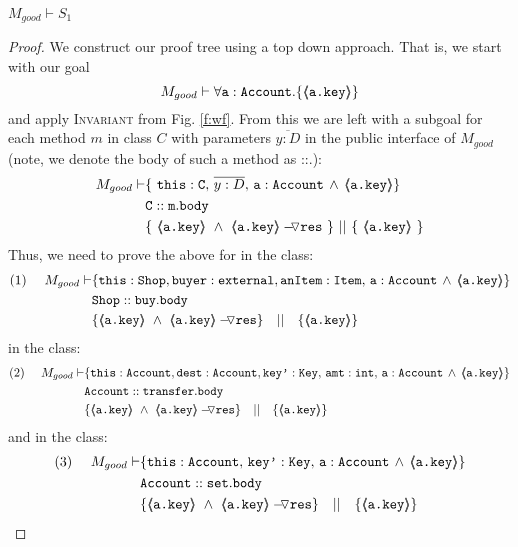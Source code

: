 \begin{lemma}
\label{lemma:exampleKeyProtect}
$M_{good} \vdash S_1$
\end{lemma}
\begin{proof}
We construct our proof tree using a top down approach.  That is, we start with our goal
$$M_{good} \vdash \forall {\mbox{\normalfont{\texttt{a}}}:\mbox{\normalfont{\texttt{Account}}}}.{{\{}}{\langle\!\!\langle \mbox{\normalfont{\texttt{\mbox{\normalfont{\texttt{a.key}}}}}} \rangle\!\!\rangle}{{\}}}$$
and apply  \textsc{Invariant} from Fig. \ref{f:wf}.
From this we are left with a subgoal for each method $m$ in  class $C$ with parameters $\overline{y:D}$ in the public interface of $M_{good}$ (note, we denote the body of such a method as ::.):
\small
\begin{align*}
M_{good} \vdash
		& \{ \ \prg{this}:\prg{C},\, \overline{y:D},\, \prg{a}:\prg{Account}\, \wedge\,
		   {\inside{\prg{a.key}}}\} \\
		& \prg{C}::\prg{m}.\prg{body}\ \\
		& \{\ {\inside{\prg{a.key}}}\ \wedge\ {\PushASLong {\prg{res}} {\inside{\prg{a.key}}}}\ \}\ ||\ \{\ {\inside{\prg{a.key}}} \ 			\} 
\end{align*}
\normalsize
Thus, we need to prove the above for  in the  class:
\small
\begin{align*}
\text{(1)}  \ \ \ \ M_{good} \vdash 
		&	\{  \prg{this}:\prg{Shop}, \prg{buyer} : \prg{external}, \prg{anItem} : \prg{Item},\, \prg{a}:\prg{Account}\,\wedge\, 
				{\inside{\prg{a.key}}} \} \\
		& \prg{Shop}::\prg{buy}.\prg{body}\ \\  
		& \{ {\inside{\prg{a.key}}}\ \wedge\ {\PushASLong {\prg{res}} {\inside{\prg{a.key}}}}  \} \ \ \  || \ \ \ 
		   \{ {\inside{\prg{a.key}}} \}
\end{align*}
\normalsize
{} in the  class:
\small
\begin{align*}
\text{(2)}  \ \ \ \ M_{good} \vdash 
		&	\{  \prg{this}:\prg{Account}, \prg{dest} : \prg{Account}, 
			\prg{key'} : \prg{Key},\, \prg{amt}:\prg{int},\, \prg{a}:\prg{Account}\,
			\wedge\,{\inside{\prg{a.key}}} \} \\
		& \prg{Account}::\prg{transfer}.\prg{body}\ \\  
		& \{ {\inside{\prg{a.key}}}\ \wedge\ {\PushASLong {\prg{res}} {\inside{\prg{a.key}}}}  \} \ \ \  || \ \ \ 
		   \{ {\inside{\prg{a.key}}} \}
\end{align*}
\normalsize
and  in the  class:
\small
\begin{align*}
\text{(3)}  \ \ \ \ M_{good} \vdash 
		&	\{  \prg{this}:\prg{Account},\,
			\prg{key'} : \prg{Key},\, \prg{a}:\prg{Account}\,
			\wedge\,{\inside{\prg{a.key}}} \} \\
		& \prg{Account}::\prg{set}.\prg{body}\ \\  
		& \{ {\inside{\prg{a.key}}}\ \wedge\ {\PushASLong {\prg{res}} {\inside{\prg{a.key}}}}  \} \ \ \  || \ \ \ 
		   \{ {\inside{\prg{a.key}}} \}
\end{align*}
\normalsize


\end{proof}
